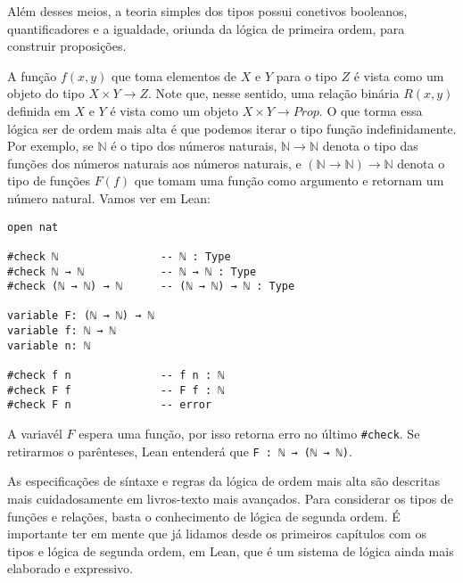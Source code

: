 Além desses meios, a teoria simples dos tipos possui conetivos booleanos,
quantificadores e a igualdade, oriunda da lógica de primeira ordem, para
construir proposições. 

A função $f(x,y)$ que toma elementos de $X$ e $Y$ para o tipo $Z$ é vista como
um objeto do tipo $X \times Y \to Z$. Note que, nesse sentido, uma relação
binária $R(x,y)$ definida em $X$ e $Y$ é vista como um objeto $X \times Y \to
Prop$. O que torma essa lógica ser de ordem mais alta é que podemos iterar o
tipo função indefinidamente. Por exemplo, se $\mathbb{N}$ é o tipo dos números
naturais, $\mathbb{N} \to \mathbb{N}$ denota o tipo das funções dos números
naturais aos números naturais, e $(\mathbb{N} \to \mathbb{N}) \to \mathbb{N}$
denota o tipo de funções $F(f)$ que tomam uma função como argumento e retornam
um número natural. Vamos ver em Lean:

\begin{lstlisting}
open nat 

#check ℕ                -- ℕ : Type
#check ℕ → ℕ            -- ℕ → ℕ : Type
#check (ℕ → ℕ) → ℕ      -- (ℕ → ℕ) → ℕ : Type 

variable F: (ℕ → ℕ) → ℕ 
variable f: ℕ → ℕ
variable n: ℕ 

#check f n              -- f n : ℕ 
#check F f              -- F f : ℕ 
#check F n              -- error
\end{lstlisting}

A variavél $F$ espera uma função, por isso retorna erro no último
\lstinline{#check}. Se retirarmos o parênteses, Lean entenderá que
\lstinline{F : ℕ → (ℕ → ℕ)}. 

As especificações de síntaxe e regras da lógica de ordem mais alta são
descritas mais cuidadosamente em livros-texto mais avançados. Para considerar
os tipos de funções e relações, basta o conhecimento de lógica de segunda
ordem. É importante ter em mente que já lidamos desde os primeiros capítulos
com os tipos e lógica de segunda ordem, em Lean, que é um sistema de lógica
ainda mais elaborado e expressivo. 